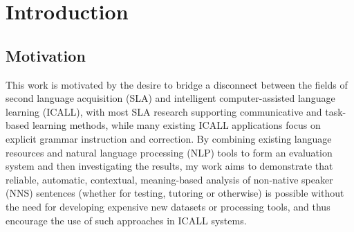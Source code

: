 \chapter{Introduction}
\label{chap:intro}

%
%
%
%
%

\section{Motivation}
\label{sec:motivation}


This work is motivated by the desire to bridge a disconnect between the fields of second language acquisition (SLA) and intelligent computer-assisted language learning (ICALL), with most SLA research supporting communicative and task-based learning methods, while many existing ICALL applications focus on explicit grammar instruction and correction. By combining existing language resources and natural language processing (NLP) tools to form an evaluation system and then investigating the results, my work aims to demonstrate that reliable, automatic, contextual, meaning-based analysis of non-native speaker (NNS) sentences (whether for testing, tutoring or otherwise) is possible without the need for developing expensive new datasets or processing tools, and thus encourage the use of such approaches in ICALL systems. 

